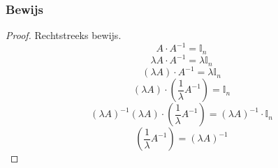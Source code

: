 \documentclass[lineaire_algebra_oplossingen.tex]{subfiles}
\begin{document}
\subsubsection*{Bewijs}
\begin{proof}
Rechtstreeks bewijs.\\
\[
A\cdot A^{-1} = \mathbb{I}_n
\]
\[
\lambda A\cdot A^{-1} = \lambda\mathbb{I}_n
\]
\[
(\lambda A)\cdot A^{-1} = \lambda\mathbb{I}_n
\]
\[
(\lambda A)\cdot (\frac{1}{\lambda}A^{-1}) = \mathbb{I}_n
\]
$$(\lambda A)^{-1}(\lambda A)\cdot (\frac{1}{\lambda}A^{-1}) = (\lambda A)^{-1} \cdot \mathbb{I}_n$$
$$(\frac{1}{\lambda}A^{-1}) = (\lambda A)^{-1}$$
\end{proof}
\end{document}
